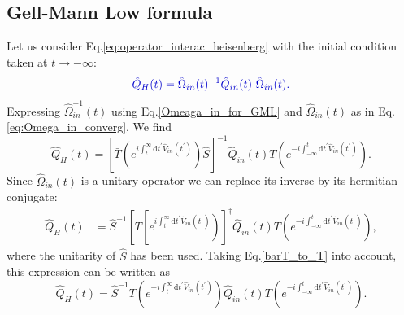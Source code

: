 \documentclass[12pt, titlepage]{article}
\begin{document}
\subsection{Gell-Mann Low formula}
Let us consider Eq.\enskip\eqref{eq:operator_interac_heisenberg} with the initial condition taken at $ t \rightarrow - \infty $:
\begin{equation}\textcolor[RGB]{0,0,204}{
\hat{Q}_{H}(t)=\hat{\Omega}_{in}(t)^{-1}\hat{Q}_{in}(t)\ \hat{\Omega}_{in}(t).
}
\end{equation}
Expressing $ \hat{\Omega}^{-1}_{in}(t) $ using Eq.\enskip\eqref{Omeaga_in_for_GML} and $ \hat{\Omega}_{in}(t) $ as in Eq.\enskip\eqref{eq:Omega_in_converg}. We find 
\begin{equation}
\hat{Q}_{H}(t)
=\left[ 
\bar{T}
\left( 
 e^{i\int_{t}^{\infty}\mathrm{d}t^{\prime} \hat{V}_{in}(t^{\prime})}
\right) 
\hat{S}
\right]^{-1}
\hat{Q}_{in}(t)
T
\left( 
 e^{-i\int_{-\infty}^{t}\mathrm{d}t^{\prime} \hat{V}_{in}(t^{\prime})}
\right) 
.
\end{equation}
Since $ \hat{\Omega}_{in}(t) $ is a unitary operator we can replace its inverse by its hermitian conjugate:
\begin{subequations}
\begin{align}
\hat{Q}_{H}(t)
&=
\hat{S}^{-1}\left[ 
\bar{T}
\left[ 
 e^{i\int_{t}^{\infty}\mathrm{d}t^{\prime} \hat{V}_{in}(t^{\prime})}
\right) 
\right]^{\dagger}
\hat{Q}_{in}(t)
T
\left( 
 e^{-i\int_{-\infty}^{t}\mathrm{d}t^{\prime} \hat{V}_{in}(t^{\prime})}
\right) 
,
\end{align}
\end{subequations}
where the unitarity of $ \hat{S} $ has been used.
Taking Eq.\enskip\eqref{barT_to_T} into account, this expression can be written as
\begin{equation}\label{1st_expression_for_Omega_H}
\hat{Q}_{H}(t)
=
\hat{S}^{-1} 
T
\left( 
 e^{-i\int_{t}^{\infty}\mathrm{d}t^{\prime} \hat{V}_{in}(t^{\prime})}
\right)
\hat{Q}_{in}(t)
T
\left( 
 e^{-i\int_{-\infty}^{t}\mathrm{d}t^{\prime} \hat{V}_{in}(t^{\prime})}
\right) .
\end{equation}
\end{document}
